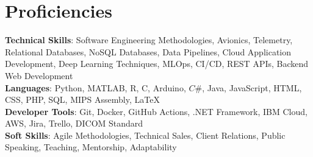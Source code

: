 \documentclass[letterpaper,11.5pt]{article}
\def\proficiencySpace{3pt}
\begin{document}
\section{Proficiencies}
\vspace{2pt}
 \begin{itemize}[leftmargin=0.15in, label={}]
    \small{\item{
     \textbf{Technical Skills}{: Software Engineering Methodologies, Avionics, Telemetry, Relational Databases, NoSQL Databases, Data Pipelines, Cloud Application Development, Deep Learning Techniques, MLOps, CI/CD, REST APIs, Backend Web Development} \vspace{\proficiencySpace} \\ 
     \textbf{Languages}{: Python, MATLAB, R, C, Arduino, $C\#$, Java, JavaScript, HTML, CSS, PHP, SQL, MIPS Assembly, LaTeX} \vspace{\proficiencySpace} \\
     \textbf{Developer Tools}{: Git, Docker, GitHub Actions, .NET Framework, IBM Cloud, AWS, Jira, Trello, DICOM Standard} \vspace{\proficiencySpace} \\
     \textbf{Soft Skills}{: Agile Methodologies, Technical Sales, Client Relations, Public Speaking, Teaching, Mentorship, Adaptability}
    }}
 \end{itemize}
\end{document}
